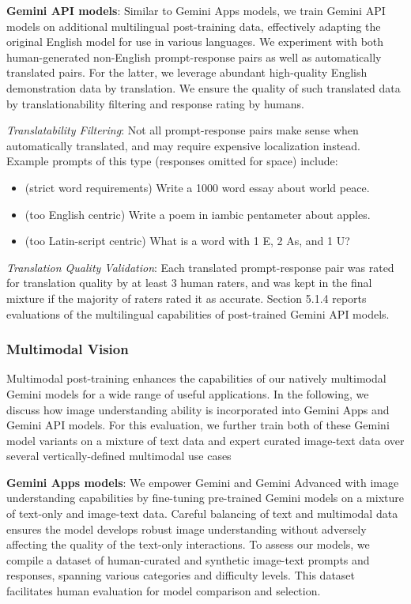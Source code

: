 \textbf{Gemini API models}: Similar to Gemini Apps models, we train Gemini API models on additional multilingual post-training data, effectively adapting the original English model for use in various languages. We experiment with both human-generated non-English prompt-response pairs as well as automatically translated pairs. For the latter, we leverage abundant high-quality English demonstration data by translation. We ensure the quality of such translated data by translationability filtering and response rating by humans.

\emph{Translatability Filtering}: Not all prompt-response pairs make sense when automatically translated, and may require expensive localization instead. Example prompts of this type (responses omitted for space) include:

\begin{itemize}
\item (strict word requirements) Write a 1000 word essay about world peace.
\item (too English centric) Write a poem in iambic pentameter about apples.
\item (too Latin-script centric) What is a word with 1 E, 2 As, and 1 U?
\end{itemize}

\emph{Translation Quality Validation}: Each translated prompt-response pair was rated for translation quality by at least 3 human raters, and was kept in the final mixture if the majority of raters rated it as accurate.
Section 5.1.4 reports evaluations of the multilingual capabilities of post-trained Gemini API models.

\subsubsection{Multimodal Vision}

Multimodal post-training enhances the capabilities of our natively multimodal Gemini models for a wide range of useful applications. In the following, we discuss how image understanding ability is incorporated into Gemini Apps and Gemini API models. For this evaluation, we further train both of these Gemini model variants on a mixture of text data and expert curated image-text data over several vertically-defined multimodal use cases

\textbf{Gemini Apps models}: We empower Gemini and Gemini Advanced with image understanding capabilities by fine-tuning pre-trained Gemini models on a mixture of text-only and image-text data. Careful balancing of text and multimodal data ensures the model develops robust image understanding without adversely affecting the quality of the text-only interactions. To assess our models, we compile a dataset of human-curated and synthetic image-text prompts and responses, spanning various categories and difficulty levels. This dataset facilitates human evaluation for model comparison and selection.

